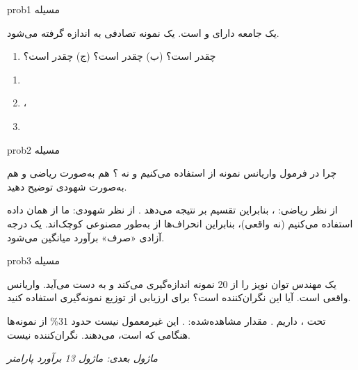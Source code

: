 \begin{PSbox}[unbreakable]{prob}{مسیله 1}

یک جامعه دارای  و  است. یک نمونه تصادفی به اندازه  گرفته می‌شود.

\begin{enumerate}
\def\labelenumi{(\PSalph{enumi})}
\tightlist
\item
   چقدر است؟ (ب)  چقدر است؟ (ج)  چقدر است؟
\end{enumerate}

\PSsolution{} 

\begin{enumerate}
\def\labelenumi{(\PSalph{enumi})}
\tightlist
\item
\item
  ، 
\item
\end{enumerate}

\end{PSbox}

\begin{PSbox}[unbreakable]{prob}{مسیله 2}

چرا در فرمول واریانس نمونه از  استفاده می‌کنیم و نه ؟ هم به‌صورت ریاضی و هم به‌صورت شهودی توضیح دهید.

\PSsolution{} از نظر ریاضی: ، بنابراین تقسیم بر  نتیجه می‌دهد . از نظر شهودی: ما از  همان داده استفاده می‌کنیم (نه \lr{$\mu$} واقعی)، بنابراین انحراف‌ها از  به‌طور مصنوعی کوچک‌اند. یک درجه آزادی «صرف» برآورد میانگین می‌شود.

\end{PSbox}

\begin{PSbox}[unbreakable]{prob}{مسیله 3}

یک مهندس توان نویز را از 20 نمونه اندازه‌گیری می‌کند و  به دست می‌آید. واریانس واقعی  است. آیا این نگران‌کننده است؟ برای ارزیابی از توزیع نمونه‌گیری استفاده کنید.

\PSsolution{} تحت ، داریم . مقدار مشاهده‌شده: . این غیرمعمول نیست  حدود 31\% از نمونه‌ها هنگامی که  است،  می‌دهند. نگران‌کننده نیست.

\emph{ماژول بعدی: {ماژول 13  برآورد پارامتر}}

\end{PSbox}

